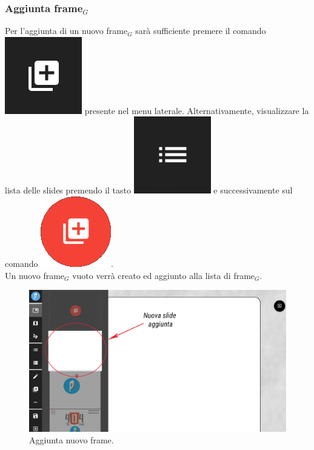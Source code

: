 \newpage
\subsubsection{Aggiunta frame$_G$}
Per l'aggiunta di un nuovo frame$_G$ sarà sufficiente premere il comando \includegraphics[scale=0.4]{img/add_slide_dark.png} presente nel menu laterale. Alternativamente, visualizzare la lista delle slides premendo il tasto \includegraphics[scale=0.4]{img/slides_list.png} e successivamente sul comando \includegraphics[scale=0.4]{img/add_slide_red.png}.\\

\noindent Un nuovo frame$_G$ vuoto verrà creato ed aggiunto alla lista di frame$_G$.

\begin{figure}[H]
\begin{center}
\includegraphics[scale=0.3]{img/screen_add_frame.png}
\caption{Aggiunta nuovo frame.}
\end{center}
\end{figure}

